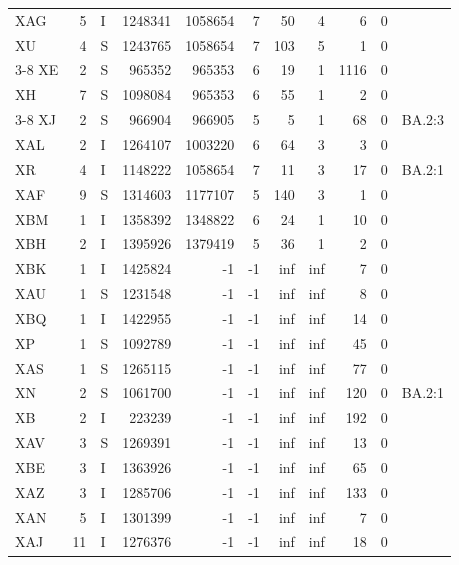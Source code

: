 \documentclass[a4paper]{article}
\begin{document}
\begin{footnotesize}
\begin{center}
\begin{tabular}{lrlrrrrrrrl}
XAG & 5 & I & 1248341 & 1058654 & 7 & 50 & 4 & 6 & 0 & {} \\
XU & 4 & S & 1243765 & 1058654 & 7 & 103 & 5 & 1 & 0 & {} \\
\cmidrule{3-8}
XE & 2 & S & 965352 & 965353 & 6 & 19 & 1 & 1116 & 0 & {} \\
XH & 7 & S & 1098084 & 965353 & 6 & 55 & 1 & 2 & 0 & {} \\
\cmidrule{3-8}
XJ & 2 & S & 966904 & 966905 & 5 & 5 & 1 & 68 & 0 & {BA.2:3} \\
XAL & 2 & I & 1264107 & 1003220 & 6 & 64 & 3 & 3 & 0 & {} \\
XR & 4 & I & 1148222 & 1058654 & 7 & 11 & 3 & 17 & 0 & {BA.2:1} \\
\midrule
XAF & 9 & S & 1314603 & 1177107 & 5 & 140 & 3 & 1 & 0 & {} \\
XBM & 1 & I & 1358392 & 1348822 & 6 & 24 & 1 & 10 & 0 & {} \\
XBH & 2 & I & 1395926 & 1379419 & 5 & 36 & 1 & 2 & 0 & {} \\
\midrule
XBK & 1 & I & 1425824 & -1 & -1 & inf & inf & 7 & 0 & {} \\
XAU & 1 & S & 1231548 & -1 & -1 & inf & inf & 8 & 0 & {} \\
XBQ & 1 & I & 1422955 & -1 & -1 & inf & inf & 14 & 0 & {} \\
XP & 1 & S & 1092789 & -1 & -1 & inf & inf & 45 & 0 & {} \\
XAS & 1 & S & 1265115 & -1 & -1 & inf & inf & 77 & 0 & {} \\
XN & 2 & S & 1061700 & -1 & -1 & inf & inf & 120 & 0 & {BA.2:1} \\
XB & 2 & I & 223239 & -1 & -1 & inf & inf & 192 & 0 & {} \\
XAV & 3 & S & 1269391 & -1 & -1 & inf & inf & 13 & 0 & {} \\
XBE & 3 & I & 1363926 & -1 & -1 & inf & inf & 65 & 0 & {} \\
XAZ & 3 & I & 1285706 & -1 & -1 & inf & inf & 133 & 0 & {} \\
XAN & 5 & I & 1301399 & -1 & -1 & inf & inf & 7 & 0 & {} \\
XAJ & 11 & I & 1276376 & -1 & -1 & inf & inf & 18 & 0 & {} \\
\bottomrule
\end{tabular}

\end{center}
\end{footnotesize}
\end{document}

